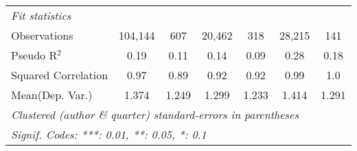 \begin{tabular}{lcccccc}
   \midrule
   \emph{Fit statistics}\\
   Observations                                               & 104,144 & 607           & 20,462  & 318           & 28,215        & 141\\  
   Pseudo R$^2$                                               & 0.19    & 0.11          & 0.14    & 0.09          & 0.28          & 0.18\\  
   Squared Correlation                                        & 0.97    & 0.89          & 0.92    & 0.92          & 0.99          & 1.0\\  
Mean(Dep. Var.) & 1.374 & 1.249 & 1.299 & 1.233 & 1.414 & 1.291 \\
   \midrule \midrule
   \multicolumn{7}{l}{\emph{Clustered (author \& quarter) standard-errors in parentheses}}\\
   \multicolumn{7}{l}{\emph{Signif. Codes: ***: 0.01, **: 0.05, *: 0.1}}\\
\end{tabular}
\par\endgroup
